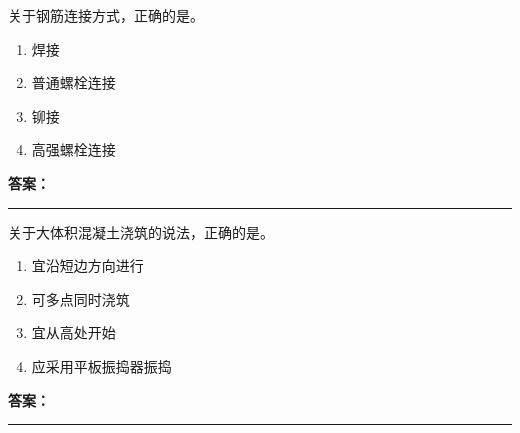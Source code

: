 \documentclass[UTF8,fontset=fandol,11pt]{ctexart}
\newcommand{\answerline}{\textcolor{answerred}{\rule{2.4cm}{0.7pt}}}
\begin{document}
\begin{quizbox}[title={乱序第 25 题｜第四章混凝土结构工程}]

关于钢筋连接方式，正确的是。\\

\begin{enumerate}[label=\Alph*.]

\item 焊接

\item 普通螺栓连接

\item 铆接

\item 高强螺栓连接

\end{enumerate}

\textbf{\textcolor{answerred}{答案：}} \answerline

\end{quizbox}

\vspace{0.2em}

\begin{quizbox}[title={乱序第 26 题｜第四章混凝土结构工程}]

关于大体积混凝土浇筑的说法，正确的是。\\

\begin{enumerate}[label=\Alph*.]

\item 宜沿短边方向进行

\item 可多点同时浇筑

\item 宜从高处开始

\item 应采用平板振捣器振捣

\end{enumerate}

\textbf{\textcolor{answerred}{答案：}} \answerline

\end{quizbox}

\vspace{0.2em}
\end{document}
